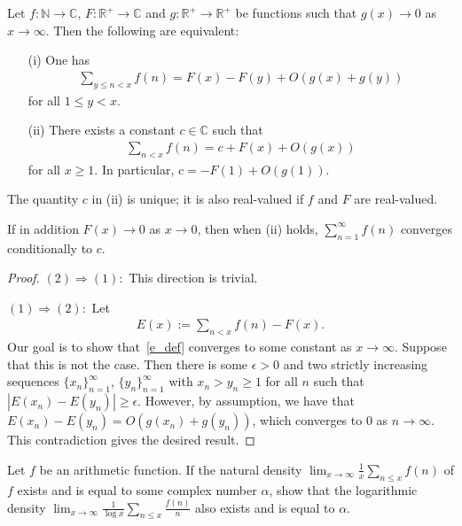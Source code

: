 \documentclass[11pt]{article}
\newenvironment{ex}[1]
  {\renewcommand\theinnercustomthm{#1}\innercustomthm}
  {\endinnercustomthm}
\begin{document}
\begin{ex}{6}\label{six}
Let $f:\mathbb{N}\to\mathbb{C}$, $F:\mathbb{R}^+\to\mathbb{C}$ and $g:\mathbb{R}^+\to\mathbb{R}^+$ be functions such that $g(x)\to 0$ as $x\to\infty$. Then the following are equivalent:
\begin{enumerate}
\item[(i)]One has
\begin{align*}
\sum_{y\leq n<x} f(n) = F(x)-F(y)+O(g(x)+g(y))
\end{align*}
for all $1\leq y<x$.
\item[(ii)] There exists a constant $c\in\mathbb{C}$ such that
\begin{align*}
\sum_{n<x}f(n) = c+F(x)+O(g(x))
\end{align*}
for all $x\geq 1$. In particular, $c=-F(1)+O(g(1))$.
\end{enumerate}
The quantity $c$ in (ii) is unique; it is also real-valued if $f$ and $F$ are real-valued.

If in addition $F(x)\to 0$ as $x\to 0$, then when (ii) holds, $\sum_{n=1}^\infty f(n)$ converges conditionally to $c$.
\end{ex}

\begin{proof}
$(2)\Rightarrow(1):$ This direction is trivial.

$(1)\Rightarrow(2):$ Let
\begin{align}
E(x):= \sum_{n<x} f(n) - F(x).\label{e_def}
\end{align}
Our goal is to show that~\eqref{e_def} converges to some constant as $x\to\infty$. Suppose that this is not the case. Then there is some $\epsilon >0$ and two strictly increasing sequences $\{x_n\}_{n=1}^\infty$, $\{y_n\}_{n=1}^\infty$ with $x_n > y_n\geq 1$ for all $n$ such that $|E(x_n)-E(y_n)| \geq \epsilon$. However, by assumption, we have that $E(x_n)-E(y_n)=O(g(x_n)+g(y_n))$, which converges to 0 as $n\to\infty$. This contradiction gives the desired result.
\end{proof}

\begin{ex}{7}\label{seven}
Let $f$ be an arithmetic function. If the natural density $\lim_{x\to\infty}\frac{1}{x}\sum_{n\leq x}f(n)$ of $f$ exists and is equal to some complex number $\alpha$, show that the logarithmic density $\lim_{x\to\infty}\frac{1}{\log{x}}\sum_{n\leq x}\frac{f(n)}{n}$ also exists and is equal to $\alpha$.
\end{ex}
\end{document}
